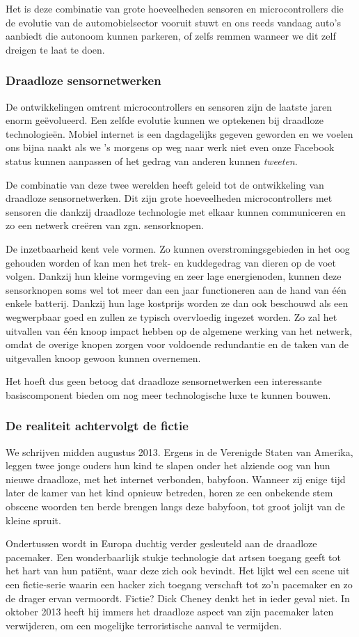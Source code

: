 \documentclass[DIV=calc,paper=a4,fontsize=11pt,twocolumn,draft]{scrartcl}
\newcommand{\heading}[1]{
\subsubsection*{#1}
\vspace{-2mm}
}
\begin{document}
Het is deze combinatie van grote hoeveelheden sensoren en microcontrollers die
de evolutie van de automobielsector vooruit stuwt en ons reeds vandaag auto's
aanbiedt die autonoom kunnen parkeren, of zelfs remmen wanneer we dit zelf
dreigen te laat te doen.

\heading{Draadloze sensornetwerken}

De ontwikkelingen omtrent microcontrollers en sensoren zijn de laatste jaren
enorm ge\"evolueerd. Een zelfde evolutie kunnen we optekenen bij draadloze
technologie\"en. Mobiel internet is een dagdagelijks gegeven geworden en we
voelen ons bijna naakt als we 's morgens op weg naar werk niet even onze
Facebook status kunnen aanpassen of het gedrag van anderen kunnen
\emph{tweeten}.

De combinatie van deze twee werelden heeft geleid tot de ontwikkeling van
draadloze sensornetwerken. Dit zijn grote hoeveelheden microcontrollers met
sensoren die dankzij draadloze technologie met elkaar kunnen communiceren en zo
een netwerk cre\"eren van zgn. sensorknopen.

De inzetbaarheid kent vele vormen. Zo kunnen overstromingsgebieden in het oog
gehouden worden of kan men het trek- en kuddegedrag van dieren op de voet
volgen. Dankzij hun kleine vormgeving en zeer lage energienoden, kunnen deze
sensorknopen soms wel tot meer dan een jaar functioneren aan de hand van
\'e\'en enkele batterij. Dankzij hun lage kostprijs worden ze dan ook beschouwd
als een wegwerpbaar goed en zullen ze typisch overvloedig ingezet worden. Zo
zal het uitvallen van \'e\'en knoop impact hebben op de algemene werking van
het netwerk, omdat de overige knopen zorgen voor voldoende redundantie en de
taken van de uitgevallen knoop gewoon kunnen overnemen.

Het hoeft dus geen betoog dat draadloze sensornetwerken een interessante
basiscomponent bieden om nog meer technologische luxe te kunnen bouwen.

\heading{De realiteit achtervolgt de fictie}

We schrijven midden augustus 2013. Ergens in de Verenigde Staten van Amerika,
leggen twee jonge ouders hun kind te slapen onder het alziende oog van hun
nieuwe draadloze, met het internet verbonden, babyfoon. Wanneer zij enige tijd
later de kamer van het kind opnieuw betreden, horen ze een onbekende stem
obscene woorden ten berde brengen langs deze babyfoon, tot groot jolijt van de
kleine spruit.

Ondertussen wordt in Europa duchtig verder gesleuteld aan de draadloze
pacemaker. Een wonderbaarlijk stukje technologie dat artsen toegang geeft tot
het hart van hun pati\"ent, waar deze zich ook bevindt. Het lijkt wel een scene
uit een fictie-serie waarin een hacker zich toegang verschaft tot zo'n
pacemaker en zo de drager ervan vermoordt. Fictie? Dick Cheney denkt het in
ieder geval niet. In oktober 2013 heeft hij immers het draadloze aspect van
zijn pacemaker laten verwijderen, om een mogelijke terroristische aanval te
vermijden.
\end{document}
